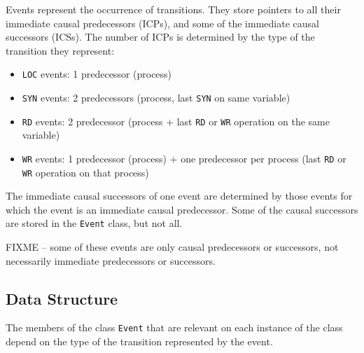 \documentclass{llncs}
\begin{document}
Events represent the occurrence of transitions.
They store pointers to all their immediate causal predecessors (ICPs), and some of
the immediate causal successors (ICSs).
The number of ICPs is determined by the type of the transition they
represent:

\begin{itemize}
\item \verb!LOC! events: 1 predecessor (process)
\item \verb!SYN! events: 2 predecessors (process, last \verb!SYN! on same variable)
\item \verb!RD!  events: 2 predecessor (process + last \verb!RD! or
	\verb!WR! operation on the same variable)
\item \verb!WR!  events: 1 predecessor (process) + one predecessor per
	process (last \verb!RD! or \verb!WR! operation on that process)
\end{itemize}

The immediate causal successors of one event are determined by those events
for which the event is an immediate causal predecessor. Some of the causal
successors are stored in the \verb!Event! class, but not all.

FIXME -- some of these events are only causal predecessors or successors,
not necessarily immediate predecessors or successors.

\subsection{Data Structure}
The members of the class \verb!Event! that are relevant on each instance of
the class depend on the type of the transition represented by the event.
\end{document}
